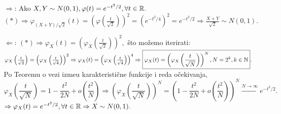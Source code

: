 \documentclass{article}
\begin{document}
\begin{enumerate}
    \item[\(\boxed{\Rightarrow}\):] Ako \(X,Y\sim N(0,1),\varphi(t)=e^{-t^2/2},\forall t\in\Bbb R.\) \((*)\Rightarrow\varphi_{(X+Y)/\sqrt 2}(t)=\left(\varphi\left(\frac{t}{\sqrt 2}\right)\right)^2=\left(e^{-t^2/4}\right)^2=e^{-t^2/2}\Rightarrow\frac{X+Y}{\sqrt 2}\sim N(0,1).\)
    \item[\(\boxed{\Leftarrow}\):] \((*)\Rightarrow\varphi_X(t)=\left(\varphi_X\left(\frac{t}{\sqrt 2}\right)\right)^2,\) što možemo iterirati:\newline \(\varphi_X\left(\frac{t}{\sqrt 2}\right)=\left(\varphi_X\left(\frac{t}{\sqrt 4}\right)\right)^2\Rightarrow\varphi_X(t)=\left(\varphi_X\left(\frac{t}{\sqrt 4}\right)\right)^4\Rightarrow\boxed{\varphi_X(t)=\left(\varphi_X\left(\frac{t}{\sqrt N}\right)\right)^N,N=2^k,k\in\Bbb N}.\)\newline Po Teoremu o vezi izme\dj{}u karakteristične funkcije i reda očekivanja, \[\varphi_X\left(\frac{t}{\sqrt N}\right)=1-\frac{t^2}{2N}+o\left(\frac{t^2}N\right)\Rightarrow\left(\varphi_X\left(\frac{t}{\sqrt N}\right)\right)^N=\left(1-\frac{t^2}{2N}+o\left(\frac{t^2}N\right)\right)^N\overset{N\to\infty}{\longrightarrow}e^{-t^2/2}.\]   \(\Rightarrow\varphi_X(t)=e^{-t^2/2},\forall t\in\Bbb R\Rightarrow X\sim N(0,1).\)
\end{enumerate}
\newpage
\end{document}
